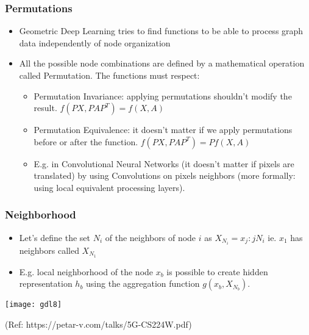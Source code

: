 \begin{frame}[fragile]\frametitle{Permutations}

\begin{itemize}
\item  Geometric Deep Learning tries to find functions to be  able to process graph data independently of node organization

\item  All the possible node combinations are defined by a mathematical operation called Permutation. The functions must respect: 
\begin{itemize}
\item Permutation Invariance: applying permutations shouldn’t modify the result. $f(PX,PAP^T )=f(X,A)$
\item Permutation Equivalence: it doesn’t matter if we apply permutations before or after the function. $f(PX, PAP^T)=Pf(X, A)$
\item E.g. in Convolutional Neural Networks (it doesn't matter if pixels are translated) by using Convolutions on pixels neighbors (more formally: using local equivalent processing layers).
\end{itemize}
	\end{itemize}


\end{frame}

\begin{frame}[fragile]\frametitle{Neighborhood}


\begin{itemize}
\item Let’s define the set $N_i$ of the neighbors of node $i$ as $X_{N_i}={x_j: j  N_i}$ ie. $x_1$ has neighbors called $X_{N_1}$
\item E.g. local neighborhood of the node $x_b$ is possible to create hidden representation $h_b$ using the aggregation function $g(x_b, X_{N_b})$.
 
\end{itemize}
	
\begin{center}
\texttt{[image: gdl8]}
\end{center}

{\tiny (Ref: https://petar-v.com/talks/5G-CS224W.pdf)}	

\end{frame}


